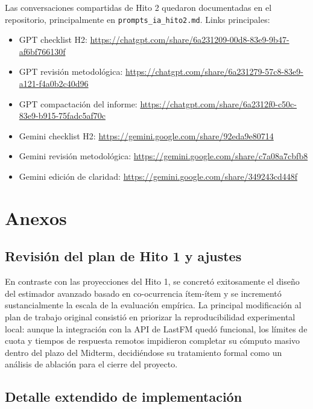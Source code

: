 \documentclass[10pt,letterpaper]{article}
\begin{document}
Las conversaciones compartidas de Hito 2 quedaron documentadas en el repositorio, principalmente en \texttt{prompts\_ia\_hito2.md}. Links principales:
\begin{itemize}
    \item GPT checklist H2: \url{https://chatgpt.com/share/6a231209-00d8-83e9-9b47-af6bf766130f}
    \item GPT revisión metodológica: \url{https://chatgpt.com/share/6a231279-57c8-83e9-a121-f4a0b2c40d96}
    \item GPT compactación del informe: \url{https://chatgpt.com/share/6a2312f0-c50c-83e9-b915-75fadc5af70c}
    \item Gemini checklist H2: \url{https://gemini.google.com/share/92eda9e80714}
    \item Gemini revisión metodológica: \url{https://gemini.google.com/share/c7a08a7cbfb8}
    \item Gemini edición de claridad: \url{https://gemini.google.com/share/349243cd448f}
\end{itemize}

\clearpage
\appendix
\section{Anexos}

\subsection{Revisión del plan de Hito 1 y ajustes}

En contraste con las proyecciones del Hito 1, se concretó exitosamente el diseño del estimador avanzado basado en co-ocurrencia ítem-ítem y se incrementó sustancialmente la escala de la evaluación empírica. La principal modificación al plan de trabajo original consistió en priorizar la reproducibilidad experimental local: aunque la integración con la API de LastFM quedó funcional, los límites de cuota y tiempos de respuesta remotos impidieron completar su cómputo masivo dentro del plazo del Midterm, decidiéndose su tratamiento formal como un análisis de ablación para el cierre del proyecto.

\subsection{Detalle extendido de implementación}
\end{document}
